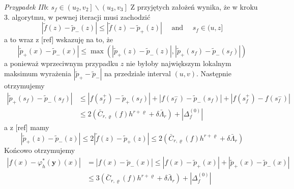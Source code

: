 \documentclass[oik, pdftex, robocza, man]{mgrwms}
\begin{document}
    \textit{Przypadek IIb}: $s_{f} \in\left(u_{2}, v_{2}\right] \backslash\left(u_{3}, v_{3}\right]$
    Z przyjętych założeń wynika, że w kroku 3. algorytmu, w pewnej iteracji musi zachodzić
    \begin{equation*}
        \left|\tilde{f}(z)-\tilde{p}_{-}(z)\right| \leq\left|\tilde{f}(z)-\tilde{p}_{+}(z)\right| \quad \text { and } \quad s_{f} \in(u, z]        
    \end{equation*}
    a to wraz z [ref] wskazuję na to, że
    \begin{equation*}
        \left|\tilde{p}_{+}(x)-\tilde{p}_{-}(x)\right| \leq \max \left(\left|\tilde{p}_{+}(z)-\tilde{p}_{-}(z)\right|,\left|\tilde{p}_{+}\left(s_{f}\right)-\tilde{p}_{-}\left(s_{f}\right)\right|\right)        
    \end{equation*}
    a ponieważ  wprzeciwnym przypadku $z$ nie byłoby największym lokalnym maksimum wyrażenia $\left|\tilde{p}_{+}-\tilde{p}_{-}\right|$ na przedziale interval $(u, v)$. Następnie otrzymujemy
    \begin{equation*}
        \begin{aligned}
            \left|\tilde{p}_{+}\left(s_{f}\right)-\tilde{p}_{-}\left(s_{f}\right)\right| & \leq\left|f\left(s_{f}^{+}\right)-\tilde{p}_{+}\left(s_{f}\right)\right|+\left|f\left(s_{f}^{-}\right)-\tilde{p}_{-}\left(s_{f}\right)\right|+\left|f\left(s_{f}^{+}\right)-f\left(s_{f}^{-}\right)\right| \\
            & \leq 2\left(\bar{C}_{r, \varrho}(f) h^{r+\varrho}+\delta \bar{\Lambda}_{r}\right)+\left|\Delta_{f}^{(0)}\right|
        \end{aligned}
    \end{equation*}
    a z [ref] mamy
    \begin{equation*}
        \left|\tilde{p}_{+}(z)-\tilde{p}_{-}(z)\right| \leq 2\left|\tilde{f}(z)-\tilde{p}_{+}(z)\right| \leq 2\left(\bar{C}_{r, \varrho}(f) h^{r+\varrho}+\delta \bar{\Lambda}_{r}\right)
    \end{equation*}
    Końcowo otrzymujemy
    \begin{equation*}
        \begin{aligned}
            \left|f(x)-\varphi_{h}^{*}(\mathbf{y})(x)\right| &=\left|f(x)-\tilde{p}_{-}(x)\right| \leq\left|f(x)-\tilde{p}_{+}(x)\right|+\left|\tilde{p}_{+}(x)-\tilde{p}_{-}(x)\right| \\
            & \leq 3\left(\bar{C}_{r, \varrho}(f) h^{r+\varrho}+\delta \bar{\Lambda}_{r}\right)+\left|\Delta_{f}^{(0)}\right|
        \end{aligned}
    \end{equation*}
    
\end{document}
